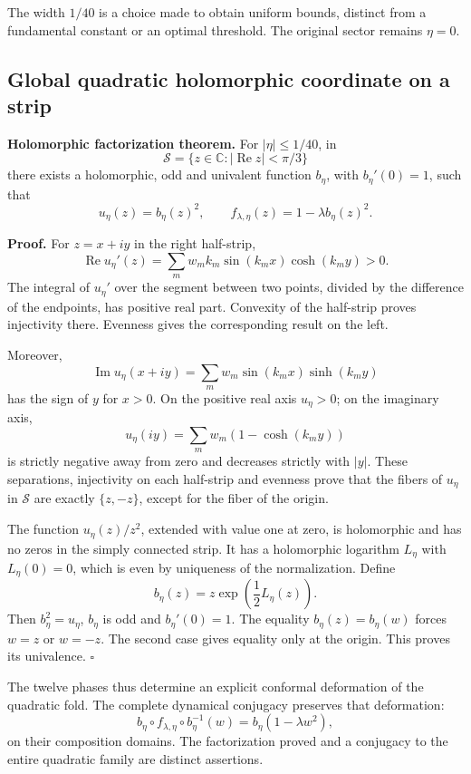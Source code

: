 The width \(1/40\) is a choice made to obtain uniform bounds, distinct from a fundamental constant or an optimal threshold. The original sector remains \(\eta=0\).


\subsection{Global quadratic holomorphic coordinate on a strip}
\label{hmtfg:desarrollo:4}

\textbf{Holomorphic factorization theorem.} For \(|\eta|\le1/40\), in
\[
\mathcal S=\{z\in\mathbb C:|\operatorname{Re}z|<\pi/3\}
\]
there exists a holomorphic, odd and univalent function \(b_\eta\), with \(b_\eta'(0)=1\), such that
\[
\boxed{u_\eta(z)=b_\eta(z)^2,\qquad
f_{\lambda,\eta}(z)=1-\lambda b_\eta(z)^2.}
\]

\textbf{Proof.} For \(z=x+iy\) in the right half-strip,
\[
\operatorname{Re}u_\eta'(z)
=\sum_mw_mk_m\sin(k_mx)\cosh(k_my)>0.
\]
The integral of \(u_\eta'\) over the segment between two points, divided by the difference of the endpoints, has positive real part. Convexity of the half-strip proves injectivity there. Evenness gives the corresponding result on the left.

Moreover,
\[
\operatorname{Im}u_\eta(x+iy)
=\sum_mw_m\sin(k_mx)\sinh(k_my)
\]
has the sign of \(y\) for \(x>0\). On the positive real axis \(u_\eta>0\); on the imaginary axis,
\[
u_\eta(iy)=\sum_mw_m(1-\cosh(k_my))
\]
is strictly negative away from zero and decreases strictly with \(|y|\). These separations, injectivity on each half-strip and evenness prove that the fibers of \(u_\eta\) in \(\mathcal S\) are exactly \(\{z,-z\}\), except for the fiber of the origin.

The function \(u_\eta(z)/z^2\), extended with value one at zero, is holomorphic and has no zeros in the simply connected strip. It has a holomorphic logarithm \(L_\eta\) with \(L_\eta(0)=0\), which is even by uniqueness of the normalization. Define
\[
b_\eta(z)=z\exp\!\left(\frac12L_\eta(z)\right).
\]
Then \(b_\eta^2=u_\eta\), \(b_\eta\) is odd and \(b_\eta'(0)=1\). The equality \(b_\eta(z)=b_\eta(w)\) forces \(w=z\) or \(w=-z\). The second case gives equality only at the origin. This proves its univalence. \(\square\)

The twelve phases thus determine an explicit conformal deformation of the quadratic fold. The complete dynamical conjugacy preserves that deformation:
\[
b_\eta\circ f_{\lambda,\eta}\circ b_\eta^{-1}(w)
=b_\eta(1-\lambda w^2),
\]
on their composition domains. The factorization proved and a conjugacy to the entire quadratic family are distinct assertions.


